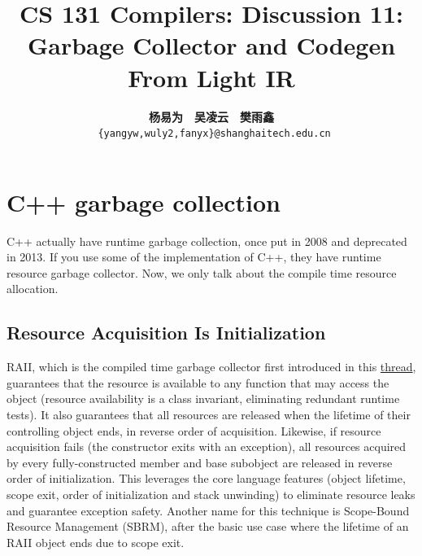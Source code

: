 \documentclass[a4paper]{exam}
\title{CS 131 Compilers: Discussion 11: Garbage Collector and Codegen From Light IR}
\author{\textbf{杨易为}~~\textbf{吴凌云}~~\textbf{樊雨鑫} \\ \texttt{ \{yangyw,wuly2,fanyx\}@shanghaitech.edu.cn}}
\theoremstyle{definition}
\begin{document}
\maketitle
\section{C++ garbage collection}
C++ actually have runtime garbage collection, once put in 2008 and deprecated in 2013. If you use some of the implementation of C++, they have runtime resource garbage collector. Now, we only talk about the compile time resource allocation.
\subsection{Resource Acquisition Is Initialization}
RAII, which is the compiled time garbage collector first introduced in this \href{http://www.open-std.org/jtc1/sc22/wg21/docs/papers/2008/n2670.htm}{thread}, guarantees that the resource is available to any function that may access the object (resource availability is a class invariant, eliminating redundant runtime tests). It also guarantees that all resources are released when the lifetime of their controlling object ends, in reverse order of acquisition. Likewise, if resource acquisition fails (the constructor exits with an exception), all resources acquired by every fully-constructed member and base subobject are released in reverse order of initialization. This leverages the core language features (object lifetime, scope exit, order of initialization and stack unwinding) to eliminate resource leaks and guarantee exception safety. Another name for this technique is Scope-Bound Resource Management (SBRM), after the basic use case where the lifetime of an RAII object ends due to scope exit.
\end{document}
